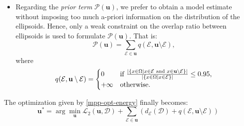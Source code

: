 \documentclass[journal]{IEEEtran}
\begin{document}
\begin{itemize}
\item Regarding the \textit{prior term} $\mathcal{P} (\mathbf{u})$, we
  prefer to obtain a model estimate without imposing too much a-priori
  information on the distribution of the ellipsoids. Hence, only a
  weak constraint on the overlap ratio between ellipsoids is used to
  formulate $\mathcal{P} (\mathbf{u})$. That is:
  \begin{equation}
    \label{eq:prior-term}
    \mathcal{P} (\mathbf{u}) = \sum_{\mathcal{E} \in \mathbf{u}}
    q(\mathcal{E}, \mathbf{u} \setminus \mathcal{E}),
  \end{equation}
  where
  \begin{equation}
    \label{eq:prior-term-detail}
    q(\mathcal{E}, \mathbf{u} \setminus \mathcal{E}) =
    \begin{cases}
      0 & \textnormal{if }\frac{ | \{ x \in \Omega | x \in \mathcal{E}
        \textnormal{ and } x \in \mathbf{u} \setminus \mathcal{E} \}
        |} { | \{ x \in \Omega | x \in \mathcal{E} \} |}
      \le 0.95, \\
      +\infty & \textnormal{otherwise}.
    \end{cases}
  \end{equation}

\end{itemize}

The optimization given by \eqref{mpp-opt-energy} finally becomes:
\begin{equation}
  \label{eq:mpp-final-opt}
  \mathbf{u}^{*}
  = \arg \min_{\mathbf{u}} \mathcal{L}_{2}(\mathbf{u},
  \mathcal{D}) + \sum_{\mathcal{E} \in \mathbf{u}} \left(
    d_{\mathcal{E}} (\mathcal{D}) + q(\mathcal{E}, \mathbf{u}
    \setminus \mathcal{E}) \right)
\end{equation}
\end{document}
